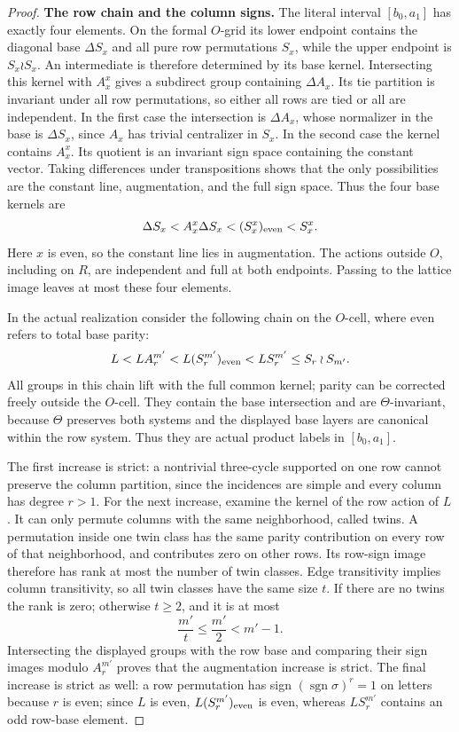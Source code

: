 \begin{proof}
\noindent\textbf{The row chain and the column signs.}
The literal interval \([b_0,a_1]\) has exactly four elements.  On
the formal \(O\)-grid its lower endpoint contains the diagonal
base \(\Delta S_x\) and all pure row permutations \(S_x\), while
the upper endpoint is \(S_x\wr S_x\).  An intermediate is therefore
determined by its base kernel.  Intersecting this kernel with
\(A_x^x\) gives a subdirect group containing \(\Delta A_x\).
Its tie partition is invariant under all row permutations, so either
all rows are tied or all are independent.  In the first case the
intersection is \(\Delta A_x\), whose normalizer in the base is
\(\Delta S_x\), since \(A_x\) has trivial centralizer in \(S_x\).
In the second case the kernel contains \(A_x^x\).  Its quotient is
an invariant sign space containing the constant vector.  Taking
differences under transpositions shows that the only possibilities
are the constant line, augmentation, and the full sign space.
Thus the four base kernels are
\[
 \Delta S_x
 <A_x^x\Delta S_x
 <(S_x^x)_{\rm even}
 <S_x^x.
\]
Here \(x\) is even, so the constant line lies in augmentation.
The actions outside \(O\), including on \(R\), are independent
and full at both endpoints.  Passing to the lattice image leaves
at most these four elements.

In the actual realization consider the following chain on the
\(O\)-cell, where even refers to total base parity:
\[
 L<L A_r^{m'}<L(S_r^{m'})_{\rm even}<L S_r^{m'}\le S_r\wr S_{m'}.
\]
All groups in this chain lift with the full common kernel; parity can be
corrected freely outside the \(O\)-cell.  They contain the base intersection
and are \(\Theta\)-invariant, because \(\Theta\) preserves both systems and
the displayed base layers are canonical within the row system.  Thus they
are actual product labels in \([b_0,a_1]\).

The first increase is strict: a nontrivial three-cycle supported on one row
cannot preserve the column partition, since the incidences are simple and
every column has degree \(r>1\).  For the next increase, examine the kernel
of the row action of \(L\).  It can only permute columns with the same
neighborhood, called twins.  A permutation inside one twin class has the
same parity contribution on every row of that neighborhood, and contributes
zero on other rows.  Its row-sign image therefore has rank at most the
number of twin classes.  Edge transitivity implies column transitivity,
so all twin classes have the same size \(t\).  If there are no twins the
rank is zero; otherwise \(t\ge2\), and it is at most
\[
 \frac{m'}t\le\frac{m'}2<m'-1.
\]
Intersecting the displayed groups with the row base and comparing their
sign images modulo \(A_r^{m'}\) proves that the augmentation increase is
strict.  The final increase is strict as well: a row permutation has sign
\((\operatorname{sgn}\sigma)^r=1\) on letters because \(r\) is even; since
\(L\) is even, \(L(S_r^{m'})_{\rm even}\) is even, whereas
\(LS_r^{m'}\) contains an odd row-base element.


\end{proof}

